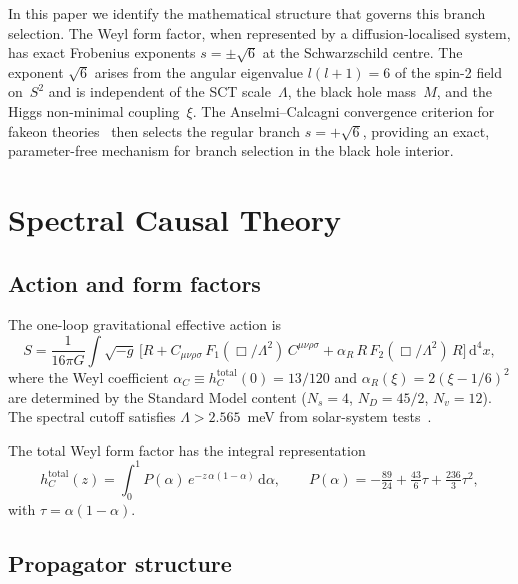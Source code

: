 \documentclass[a4paper,12pt]{article}
\newcommand{\Lam}{\Lambda}
\newcommand{\dd}{\mathrm{d}}
\begin{document}
In this paper we identify the mathematical structure that governs this
branch selection.
The Weyl form factor, when represented by a diffusion-localised system,
has exact Frobenius exponents $s=\pm\sqrt{6}$ at the Schwarzschild centre.
The exponent $\sqrt{6}$ arises from the angular eigenvalue $l(l+1)=6$ of
the spin-2 field on~$S^2$ and is independent of the SCT scale~$\Lam$,
the black hole mass~$M$, and the Higgs non-minimal coupling~$\xi$.
The Anselmi--Calcagni convergence criterion for fakeon
theories~\cite{AnselmiCalcagni2025} then selects the regular branch
$s=+\sqrt{6}$, providing an exact, parameter-free mechanism for branch
selection in the black hole interior.

\section{Spectral Causal Theory}\label{sec:sct}

\subsection{Action and form factors}

The one-loop gravitational effective action is
\begin{equation}\label{eq:action}
  S = \frac{1}{16\pi G}\int\!\sqrt{-g}\,
  \bigl[R + C_{\mu\nu\rho\sigma}\,F_1(\Box/\Lam^2)\,C^{\mu\nu\rho\sigma}
  + \alpha_R\, R\,F_2(\Box/\Lam^2)\,R\bigr]\,\dd^4x,
\end{equation}
where the Weyl coefficient
$\alpha_C\equiv h_C^{\mathrm{total}}(0)=13/120$ and
$\alpha_R(\xi)=2(\xi-1/6)^2$
are determined by the Standard Model content
($N_s=4$, $N_D=45/2$, $N_v=12$).
The spectral cutoff satisfies
$\Lam>2.565$~meV from solar-system tests~\cite{PPN1}.

The total Weyl form factor has the integral representation
\begin{equation}\label{eq:hC}
  h_C^{\mathrm{total}}(z)
  = \int_0^1 P(\alpha)\,e^{-z\,\alpha(1-\alpha)}\,\dd\alpha,
  \qquad
  P(\alpha)=-\tfrac{89}{24}+\tfrac{43}{6}\tau+\tfrac{236}{3}\tau^2,
\end{equation}
with $\tau=\alpha(1-\alpha)$.

\subsection{Propagator structure}
\end{document}
